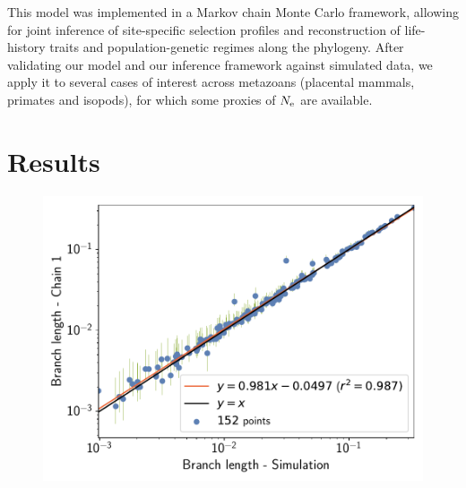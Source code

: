 \documentclass{article}
\providecommand{\DIFaddbeginFL}{} %
\providecommand{\DIFaddendFL}{} %
\providecommand{\DIFdelbeginFL}{} %
\providecommand{\DIFdelendFL}{} %
\begin{document}
    This model was implemented in a {Markov chain Monte Carlo} framework, allowing for joint inference of site-specific selection profiles and reconstruction of life-history traits and population-genetic regimes along the phylogeny.
    After validating our model and our inference framework against simulated data, we apply it to several cases of interest across metazoans (placental mammals, primates and isopods), for which some proxies of $N_{\text{e}}$ are available.


    \section{Results}
    \label{sec:Results}

    \begin{figure}[t]
        \centering
        \begin{minipage}{0.32\linewidth}
            \includegraphics[width=\linewidth, page=1]{simulations/BranchWise_SimuDiv_SiteMutSelBranchNe_BranchCorrelation_Log10BranchLength}
        \end{minipage}
        \DIFdelbeginFL %
\DIFdelendFL \DIFaddbeginFL {}\DIFaddendFL \hfill
        \begin{minipage}{0.32\linewidth}

\end{minipage}
\end{figure}
\end{document}
